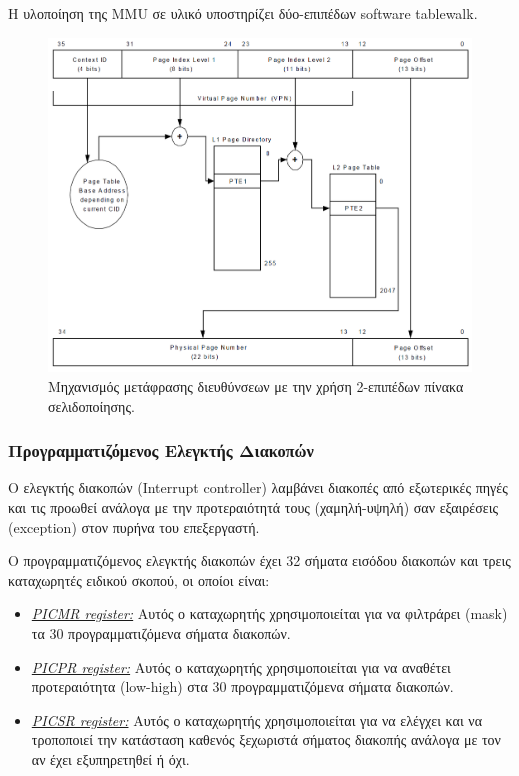 \documentclass[a4paper,10pt]{article}
\numberwithin{figure}{section}
\numberwithin{table}{section}
\begin{document}
Η υλοποίηση της MMU σε υλικό υποστηρίζει δύο-επιπέδων software tablewalk.

\vspace{0.7cm}
\begin{figure}[h!]
 \centering
 \includegraphics[bb=0 0 1158 899,scale=0.25]{./Images/IMMU_paging.png}
 \caption{Μηχανισμός μετάφρασης διευθύνσεων με την χρήση 2-επιπέδων πίνακα σελιδοποίησης.}
\end{figure}
\vspace{0.7cm}


\subsubsection{Προγραμματιζόμενος Ελεγκτής Διακοπών}

Ο ελεγκτής διακοπών (Interrupt controller) λαμβάνει διακοπές από εξωτερικές πηγές και τις
προωθεί ανάλογα με την προτεραιότητά τους (χαμηλή-υψηλή) σαν εξαιρέσεις (exception) στον
πυρήνα του επεξεργαστή.
\newline

Ο προγραμματιζόμενος ελεγκτής διακοπών έχει 32 σήματα εισόδου διακοπών και τρεις καταχωρητές ειδικού σκοπού, οι οποίοι είναι:
\begin{itemize}
 \item \underline{\emph{PICMR register:}} Αυτός ο καταχωρητής χρησιμοποιείται για να φιλτράρει (mask) τα 30 προγραμματιζόμενα σήματα διακοπών.
 \item \underline{\emph{PICPR register:}} Αυτός ο καταχωρητής χρησιμοποιείται για να αναθέτει προτεραιότητα (low-high) στα 30 προγραμματιζόμενα σήματα διακοπών.
 \item \underline{\emph{PICSR register:}} Αυτός ο καταχωρητής χρησιμοποιείται για να ελέγχει και να τροποποιεί την κατάσταση καθενός ξεχωριστά σήματος διακοπής ανάλογα με τον αν έχει εξυπηρετηθεί ή όχι.
\end{itemize}
\end{document}
